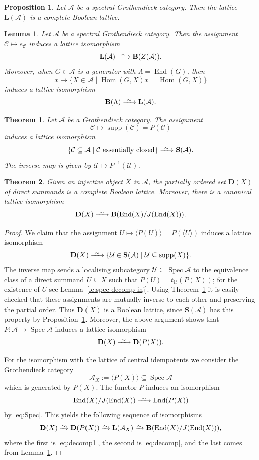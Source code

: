 \documentclass[10pt,a4paper]{amsart}
\newtheorem{lem}{Lemma}
\newtheorem{prop}{Proposition}
\newtheorem{thm}{Theorem}
\def\A{\mathcal A}
\def\C{\mathcal C}
\newcommand{\End}{\operatorname{End}}
\newcommand{\Hom}{\operatorname{Hom}}
\def\La{\Lambda}
\newcommand{\Spec}{\operatorname{Spec}}
\def\U{\mathcal U}
\def\bfB{\mathbf B}
\def\bfD{\mathbf D}
\def\bfL{\mathbf L}
\def\bfS{\mathbf S}
\newcommand{\iso}{\xrightarrow{\raisebox{-.4ex}[0ex][0ex]{$\scriptstyle{\sim}$}}}
\newcommand{\longiso}{\xrightarrow{\ \raisebox{-.4ex}[0ex][0ex]{$\scriptstyle{\sim}$}\ }}
\newcommand{\supp}{\operatorname{supp}}
\begin{document}
\begin{prop}\label{pr:Boole}
  Let $\A$ be a spectral Grothendieck category.  Then the lattice
  $\bfL(\A)$ is a complete Boolean lattice.
\end{prop}

\begin{lem}\label{le:centre}
  Let $\A$ be a spectral Grothendieck category. Then the assignment
  $\C\mapsto e_\C$ induces a lattice isomorphism
  \[\bfL(\A)\longiso\bfB(Z(\A)).\]
  Moreover, when $G\in\A$ is a generator with $\La=\End(G)$, then
   \[x\longmapsto\{X\in\A\mid \Hom(G,X)x=\Hom(G,X)\}\] induces a lattice isomorphism
  \[\bfB(\La)\longiso\bfL(\A).\]
\end{lem}

\begin{thm}\label{th:spectral}
  Let $\A$ be a Grothendieck category. The assignment
  \[\C\longmapsto\supp(\C)=P(\C)\] induces a lattice isomorphism
\[\{\C\subseteq\A\mid \C\text{ essentially closed}\}\longiso\bfS(\A).\]
The inverse map is given by  $\U\mapsto P^{-1}(\U)$.
\end{thm}

\begin{thm}\label{th:decomp}
  Given an injective object $X$ in $\A$, the partially ordered set $\bfD(X)$ of direct
  summands is a complete Boolean lattice. Moreover, there is a
  canonical lattice isomorphism
\[\bfD(X)\longiso\bfB(\End(X)/J(\End(X))).\]
\end{thm}

\begin{proof}
We claim that the assignment $U\mapsto \langle P(U)\rangle= P(\langle
U\rangle)$ induces a lattice isomorphism
\begin{equation}\label{eq:decomp}
  \bfD(X)\longiso\{\U\in\bfS(\A)\mid \U\subseteq\supp(X)\}.
\end{equation}  
The inverse map sends a localising subcategory $\U\subseteq\Spec\A$ to
the equivalence class of a direct summand $U\subseteq X$ such that
$P(U)=t_\U(P(X))$; for the existence of $U$ see
Lemma~\ref{le:spec-decomp-inj}. Using Theorem~\ref{th:spectral} it is
easily checked that these assignments are mutually inverse to each
other and preserving the partial order. Thus $\bfD(X)$ is a Boolean
lattice, since $\bfS(\A)$ has this property by
Proposition~\ref{pr:Boole}. Moreover, the above argument shows that
$P\colon\A\to\Spec\A$ induces a lattice  isomorphism
\begin{equation}\label{eq:decomp1}
  \bfD(X)\longiso\bfD(P(X)).
\end{equation}

For the isomorphism with the lattice of central idempotents we
consider the Grothendieck category
\[\A_X:=\langle P(X)\rangle\subseteq\Spec\A\] which is generated by
$P(X)$. The functor $P$ induces an isomorphism
\[\End(X)/J(\End(X))\longiso \End(P(X))\] by \eqref{eq:Spec}. This
 yields the following sequence of isomorphisms
 \[\bfD(X)\iso\bfD(P(X))\iso\bfL(\A_X)\iso\bfB(\End(X)/J(\End(X))),\]
 where the first is \eqref{eq:decomp1}, the second is \eqref{eq:decomp}, and the last comes from
 Lemma~\ref{le:centre}.
\end{proof}
\end{document}

